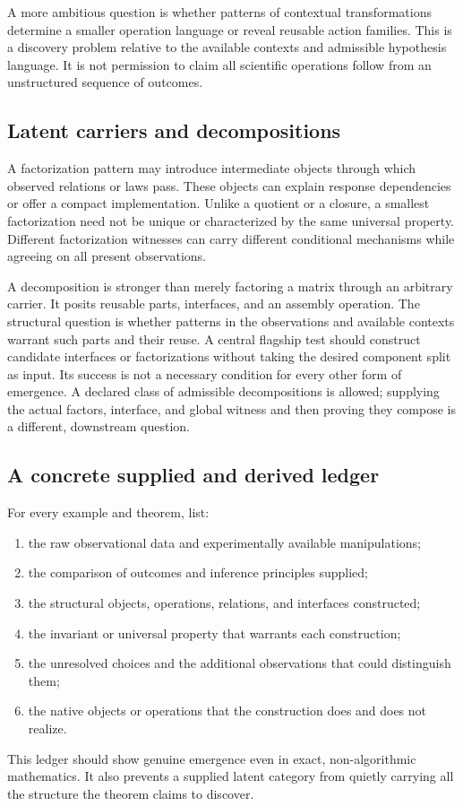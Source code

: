 \documentclass[11pt]{article}
\theoremstyle{remark}
\begin{document}
A more ambitious question is whether patterns of contextual transformations determine a smaller operation language or reveal reusable action families. This is a discovery problem relative to the available contexts and admissible hypothesis language. It is not permission to claim all scientific operations follow from an unstructured sequence of outcomes.

\subsection{Latent carriers and decompositions}

A factorization pattern may introduce intermediate objects through which observed relations or laws pass. These objects can explain response dependencies or offer a compact implementation. Unlike a quotient or a closure, a smallest factorization need not be unique or characterized by the same universal property. Different factorization witnesses can carry different conditional mechanisms while agreeing on all present observations.

A decomposition is stronger than merely factoring a matrix through an arbitrary carrier. It posits reusable parts, interfaces, and an assembly operation. The structural question is whether patterns in the observations and available contexts warrant such parts and their reuse. A central flagship test should construct candidate interfaces or factorizations without taking the desired component split as input. Its success is not a necessary condition for every other form of emergence. A declared class of admissible decompositions is allowed; supplying the actual factors, interface, and global witness and then proving they compose is a different, downstream question.

\subsection{A concrete supplied and derived ledger}

For every example and theorem, list:
\begin{enumerate}
\item the raw observational data and experimentally available manipulations;
\item the comparison of outcomes and inference principles supplied;
\item the structural objects, operations, relations, and interfaces constructed;
\item the invariant or universal property that warrants each construction;
\item the unresolved choices and the additional observations that could distinguish them;
\item the native objects or operations that the construction does and does not realize.
\end{enumerate}
This ledger should show genuine emergence even in exact, non-algorithmic mathematics. It also prevents a supplied latent category from quietly carrying all the structure the theorem claims to discover.
\end{document}
